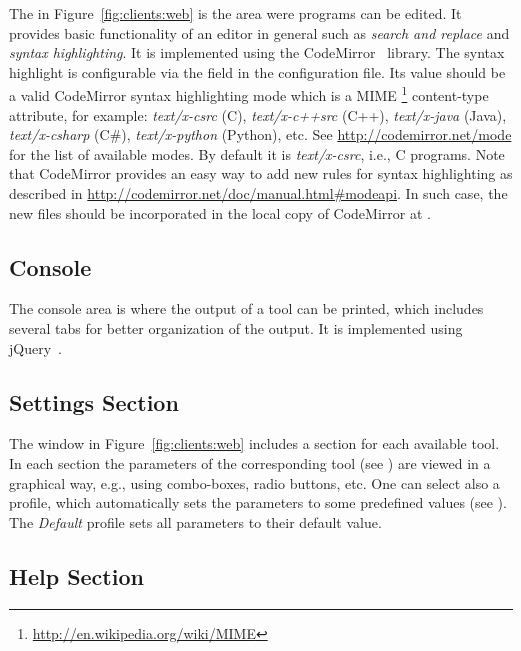 The  in Figure~\ref{fig:clients:web} is the area
were programs can be edited. It provides basic functionality of an
editor in general such as \emph{search and replace} and \emph{syntax
  highlighting}.  It is implemented using the
CodeMirror~\cite{codemirror} library.
%
The syntax highlight is configurable via the field  in
the configuration file.
%
Its value should be a valid CodeMirror syntax highlighting mode which
is a MIME%
\footnote{ \url{http://en.wikipedia.org/wiki/MIME}}
%
content-type attribute, for example: \emph{text/x-csrc} (C),
\emph{text/x-c++src} (C++), \emph{text/x-java} (Java),
\emph{text/x-csharp} (C\#), \emph{text/x-python} (Python), etc.  See
\url{http://codemirror.net/mode} for the list of available modes.
%
By default it is \emph{text/x-csrc}, i.e., C programs.
%
Note that CodeMirror provides an easy way to add new rules for syntax
highlighting as described in
\url{http://codemirror.net/doc/manual.html\#modeapi}. 
%
In such case, the new files should be incorporated in the local copy
of CodeMirror at .
%


\subsection{Console}
\label{sec:clients:web:console}

The console area is where the output of a tool can be printed, which
includes several tabs for better organization of the output. It is
implemented using jQuery~\cite{jquery}.

\subsection{Settings Section}
\label{sec:clients:web:settings}

The  window in Figure~\ref{fig:clients:web} includes a
section for each available tool. In each section the parameters of the
corresponding tool (see ) are viewed
in a graphical way, e.g., using combo-boxes, radio buttons, etc.
%
One can select also a profile, which automatically sets the parameters
to some predefined values (see ). The
\emph{Default} profile sets all parameters to their default value.

\subsection{Help Section}
\label{sec:clients:web:help}

